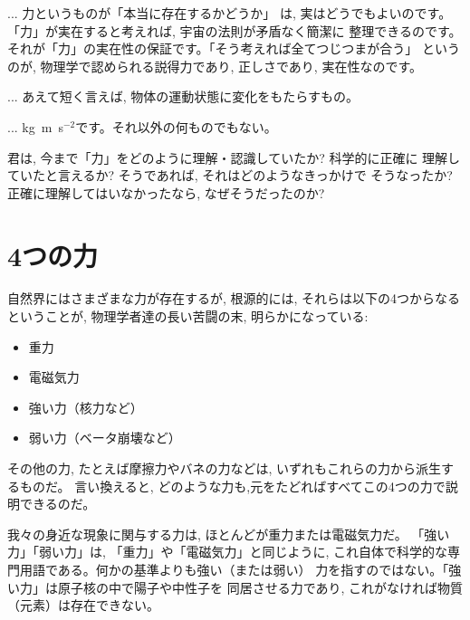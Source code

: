 \begin{faq} {\small{} ... 力というものが「本当に存在するかどうか」
は, 実はどうでもよいのです。「力」が実在すると考えれば, 宇宙の法則が矛盾なく簡潔に
整理できるのです。それが「力」の実在性の保証です。「そう考えれば全てつじつまが合う」
というのが, 物理学で認められる説得力であり, 正しさであり, 実在性なのです。
}\end{faq}

\begin{faq}{\small{}
... あえて短く言えば, 物体の運動状態に変化をもたらすもの。}\end{faq}

\begin{faq}{\small{}
... kg~m~s$^{-2}$です。それ以外の何ものでもない。}\end{faq}
\mv

\begin{q}\label{q:4forece}
君は, 今まで「力」をどのように理解・認識していたか? 科学的に正確に
理解していたと言えるか? そうであれば, それはどのようなきっかけで
そうなったか? 正確に理解してはいなかったなら, なぜそうだったのか?
\end{q}


\section{4つの力}

自然界にはさまざまな力が存在するが, 根源的には, それらは以下の4つからなる
ということが, 物理学者達の長い苦闘の末, 明らかになっている:
\begin{itemize}
\item 重力
\item 電磁気力
\item 強い力（核力など）
\item 弱い力（ベータ崩壊など）
\end{itemize}
その他の力, たとえば摩擦力やバネの力などは, いずれもこれらの力から派生するものだ。
言い換えると, どのような力も,元をたどればすべてこの4つの力で説明できるのだ。

我々の身近な現象に関与する力は, ほとんどが重力または電磁気力だ。
「強い力」「弱い力」は, 「重力」や「電磁気力」と同じように, 
これ自体で科学的な専門用語である。何かの基準よりも強い（または弱い）
力を指すのではない。「強い力」は原子核の中で陽子や中性子を
同居させる力であり, これがなければ物質（元素）は存在できない。

